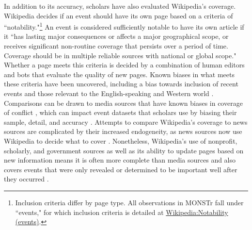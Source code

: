 \documentclass[fleqn,12pt]{article}
\begin{document}
In addition to its accuracy, scholars have also evaluated Wikipedia's coverage. Wikipedia decides if an event should have its own page based on a criteria of ``notability."\footnote{Inclusion criteria differ by page type. All observations in MONSTr fall under ``events," for which inclusion criteria is detailed at \href{https://en.wikipedia.org/wiki/Wikipedia:Notability_(events)}{Wikipedia:Notability (events)}.} An event is considered sufficiently notable to have its own article if it ``has lasting major consequences or affects a major geographical scope, or receives significant non-routine coverage that persists over a period of time. Coverage should be in multiple reliable sources with national or global scope." Whether a page meets this criteria is decided by a combination of human editors and bots that evaluate the quality of new pages. Known biases in what meets these criteria have been uncovered, including a bias towards inclusion of recent events \citep{royal_whatwikipediawhat_2009} and those relevant to the English-speaking and Western world \citep{callahan_culturalbiaswikipedia_2011}. Comparisons can be drawn to media sources that have known biases in coverage of conflict \citep{dietrich_knownunknownsmedia_2020, croicu_reportingnonfatalconflict_2022}, which can impact event datasets that scholars use by biasing their sample, detail, and accuracy \citep{douglass_connectingconflictdata_2022}. Attempts to compare Wikipedia's coverage to news sources are complicated by their increased endogeneity, as news sources now use Wikipedia to decide what to cover \citep{ren_itnotencyclopedia_2023}. Nonetheless, Wikipedia's use of nonprofit, scholarly, and government sources as well as its ability to update pages based on new information means it is often more complete than media sources and also covers events that were only revealed or determined to be important well after they occurred \citep{gildersleve_newshistoryidentifying_2022}.
\end{document}
